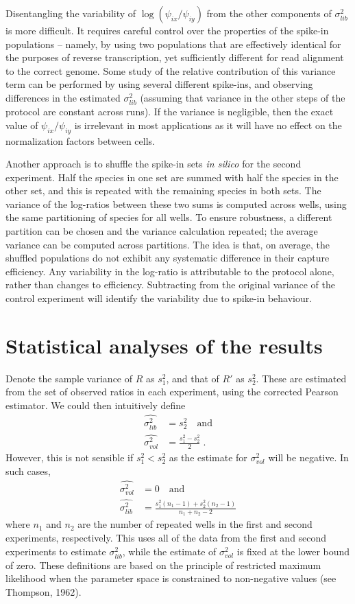 \documentclass{article}
\begin{document}
Disentangling the variability of $\log(\psi_{ix}/\psi_{iy})$ from the other components of $\sigma^2_{lib}$ is more difficult.
It requires careful control over the properties of the spike-in populations -- namely, by using two populations that are effectively identical for the purposes of reverse transcription, yet sufficiently different for read alignment to the correct genome.
Some study of the relative contribution of this variance term can be performed by using several different spike-ins, and observing differences in the estimated $\sigma^2_{lib}$ (assuming that variance in the other steps of the protocol are constant across runs).
If the variance is negligible, then the exact value of $\psi_{ix}/\psi_{iy}$ is irrelevant in most applications as it will have no effect on the normalization factors between cells.

Another approach is to shuffle the spike-in sets \textit{in silico} for the second experiment.
Half the species in one set are summed with half the species in the other set, and this is repeated with the remaining species in both sets.
The variance of the log-ratios between these two sums is computed across wells, using the same partitioning of species for all wells.
To ensure robustness, a different partition can be chosen and the variance calculation repeated; the average variance can be computed across partitions.
The idea is that, on average, the shuffled populations do not exhibit any systematic difference in their capture efficiency.
Any variability in the log-ratio is attributable to the protocol alone, rather than changes to efficiency.
Subtracting from the original variance of the control experiment will identify the variability due to spike-in behaviour.

\newpage
\section{Statistical analyses of the results}
Denote the sample variance of $R$ as $s^2_1$, and that of $R'$ as $s^2_2$.
These are estimated from the set of observed ratios in each experiment, using the corrected Pearson estimator.
We could then intuitively define
\begin{align*}
\widehat{\sigma^2_{lib}} &= s^2_2 \quad\mbox{and} \\
\widehat{\sigma^2_{vol}} &= \frac{s^2_1 - s^2_2}{2} \;.
\end{align*}
However, this is not sensible if $s^2_1 < s^2_2$ as the estimate for $\sigma^2_{vol}$ will be negative.
In such cases, 
\begin{align*}
\widehat{\sigma^2_{vol}} &= 0 \quad\mbox{and} \\
\widehat{\sigma^2_{lib}} &= \frac{s^2_1(n_1 - 1) + s^2_2(n_2-1)}{n_1 + n_2 - 2} 
\end{align*}
where $n_1$ and $n_2$ are the number of repeated wells in the first and second experiments, respectively.
This uses all of the data from the first and second experiments to estimate $\sigma^2_{lib}$, while the estimate of $\sigma^2_{vol}$ is fixed at the lower bound of zero.
These definitions are based on the principle of restricted maximum likelihood when the parameter space is constrained to non-negative values (see Thompson, 1962).
\end{document}
